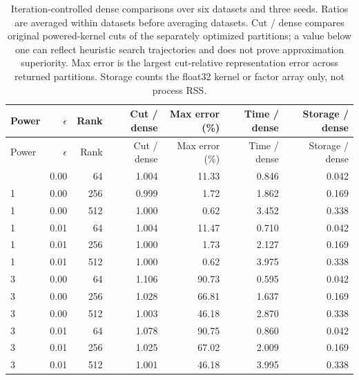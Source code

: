 \begin{longtable}{lrrrrrr}
\caption{Iteration-controlled dense comparisons over six datasets and three seeds. Ratios are averaged within datasets before averaging datasets. Cut / dense compares original powered-kernel cuts of the separately optimized partitions; a value below one can reflect heuristic search trajectories and does not prove approximation superiority. Max error is the largest cut-relative representation error across returned partitions. Storage counts the float32 kernel or factor array only, not process RSS.}\\
\toprule
Power & $\epsilon$ & Rank & Cut / dense & Max error (\%) & Time / dense & Storage / dense\\\midrule
\endfirsthead
\toprule
Power & $\epsilon$ & Rank & Cut / dense & Max error (\%) & Time / dense & Storage / dense\\\midrule
\endhead
\midrule\endfoot
\bottomrule\endlastfoot
1 & 0.00 & 64 & 1.004 & 11.33 & 0.846 & 0.042\\
1 & 0.00 & 256 & 0.999 & 1.72 & 1.862 & 0.169\\
1 & 0.00 & 512 & 1.000 & 0.62 & 3.452 & 0.338\\
1 & 0.01 & 64 & 1.004 & 11.47 & 0.710 & 0.042\\
1 & 0.01 & 256 & 1.000 & 1.73 & 2.127 & 0.169\\
1 & 0.01 & 512 & 1.000 & 0.62 & 3.975 & 0.338\\
3 & 0.00 & 64 & 1.106 & 90.73 & 0.595 & 0.042\\
3 & 0.00 & 256 & 1.028 & 66.81 & 1.637 & 0.169\\
3 & 0.00 & 512 & 1.003 & 46.18 & 2.870 & 0.338\\
3 & 0.01 & 64 & 1.078 & 90.75 & 0.860 & 0.042\\
3 & 0.01 & 256 & 1.025 & 67.02 & 2.009 & 0.169\\
3 & 0.01 & 512 & 1.001 & 46.18 & 3.995 & 0.338\\
\end{longtable}
